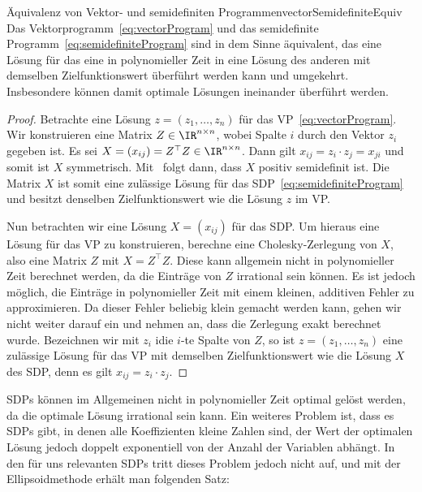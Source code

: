 \documentclass[language=ngerman,algolist]{TemplateLecture}
\begin{document}
\begin{lem}{Äquivalenz von Vektor- und semidefiniten Programmen}{vectorSemidefiniteEquiv}
    Das Vektorprogramm~\eqref{eq:vectorProgram} und das semidefinite Programm~\eqref{eq:semidefiniteProgram} sind in dem Sinne äquivalent, das eine Lösung für das eine in polynomieller Zeit in eine Lösung des anderen mit demselben Zielfunktionswert überführt werden kann und umgekehrt. Insbesondere können damit optimale Lösungen ineinander überführt werden.
\end{lem}

\begin{proof}
    Betrachte eine Lösung $z = (z_1, \ldots, z_n)$ für das VP~\eqref{eq:vectorProgram}. Wir konstruieren eine Matrix $Z \in \IR^{n \times n}$, wobei Spalte $i$ durch den Vektor $z_i$ gegeben ist. Es sei $X = (x_{ij}) = Z^\top Z \in \IR^{n \times n}$. Dann gilt $x_{ij} = z_i \cdot z_j = x_{ji}$ und somit ist $X$ symmetrisch. Mit~ folgt dann, dass $X$ positiv semidefinit ist. Die Matrix $X$ ist somit eine zulässige Lösung für das SDP~\eqref{eq:semidefiniteProgram} und besitzt denselben Zielfunktionswert wie die Lösung $z$ im VP.

    Nun betrachten wir eine Lösung $X = (x_{ij})$ für das SDP. Um hieraus eine Lösung für das VP zu konstruieren, berechne eine Cholesky-Zerlegung von $X$, also eine Matrix $Z$ mit $X = Z^\top Z$. Diese kann allgemein nicht in polynomieller Zeit berechnet werden, da die Einträge von $Z$ irrational sein können. Es ist jedoch möglich, die Einträge in polynomieller Zeit mit einem kleinen, additiven Fehler zu approximieren. Da dieser Fehler beliebig klein gemacht werden kann, gehen wir nicht weiter darauf ein und nehmen an, dass die Zerlegung exakt berechnet wurde. Bezeichnen wir mit $z_i$ idie $i$-te Spalte von $Z$, so ist $z = (z_1, \ldots, z_n)$ eine zulässige Lösung für das VP mit demselben Zielfunktionswert wie die Lösung $X$ des SDP, denn es gilt $x_{ij} = z_i \cdot z_j$.
\end{proof}

SDPs können im Allgemeinen nicht in polynomieller Zeit optimal gelöst werden, da die optimale Lösung irrational sein kann. Ein weiteres Problem ist, dass es SDPs gibt, in denen alle Koeffizienten kleine Zahlen sind, der Wert der optimalen Lösung jedoch doppelt exponentiell von der Anzahl der Variablen abhängt. In den für uns relevanten SDPs tritt dieses Problem jedoch nicht auf, und mit der Ellipsoidmethode erhält man folgenden Satz:
\end{document}
